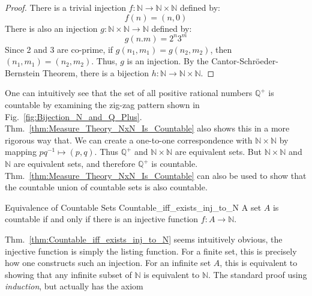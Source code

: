         \begin{proof}
            There is a trivial injection
            $f:\mathbb{N}\rightarrow\mathbb{N}\times\mathbb{N}$
            defined by:
            \begin{equation}
                f(n)=(n,0)
            \end{equation}
            There is also an injection
            $g:\mathbb{N}\times\mathbb{N}\rightarrow\mathbb{N}$
            defined by:
            \begin{equation}
                g(n.m)=2^{n}3^{m}
            \end{equation}
            Since 2 and 3 are co-prime, if
            $g(n_{1},m_{1})=g(n_{2},m_{2})$, then
            $(n_{1},m_{1})=(n_{2},m_{2})$. Thus, $g$ is an injection.
            By the Cantor-Schr\"{o}eder-Bernstein Theorem, there is a
            bijection $h:\mathbb{N}\rightarrow\mathbb{N}\times\mathbb{N}$.
        \end{proof}
        One can intuitively see that the set of all positive
        rational numbers $\mathbb{Q}^{+}$ is countable by examining
        the zig-zag pattern shown in
        Fig.~\ref{fig:Bijection_N_and_Q_Plus}.
        Thm.~\ref{thm:Measure_Theory_NxN_Is_Countable} also
        shows this in a more rigorous way that. We can create
        a one-to-one correspondence with
        $\mathbb{N}\times\mathbb{N}$ by mapping
        $pq^{\minus{1}}\mapsto(p,q)$. Thus $\mathbb{Q}^{+}$
        and $\mathbb{N}\times\mathbb{N}$ are equivalent sets.
        But $\mathbb{N}\times\mathbb{N}$ and $\mathbb{N}$
        are equivalent sets, and therefore $\mathbb{Q}^{+}$
        is countable.
        Thm.~\ref{thm:Measure_Theory_NxN_Is_Countable} can also be used
        to show that the countable union of countable sets is also
        countable.
        \begin{ltheorem}{Equivalence of Countable Sets}
              {Countable_iff_exists_inj_to_N}
            A set $A$ is countable if and only if there is an injective
            function $f:A\rightarrow\mathbb{N}$.
        \end{ltheorem}
        Thm.~\ref{thm:Countable_iff_exists_inj_to_N} seems
        intuitively obvious, the injective function is
        simply the listing function. For a finite set, this
        is precisely how one constructs such an injection.
        For an infinite set $A$, this is equivalent to
        showing that any infinite subset of $\mathbb{N}$ is
        equivalent to $\mathbb{N}$. The standard proof
        using \textit{induction}, but actually has the axiom
